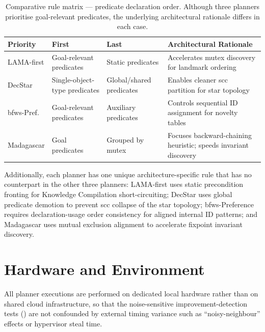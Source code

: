 \begin{table}[htbp]
  \centering
  \caption{Comparative rule matrix --- predicate declaration order. Although three planners prioritise goal-relevant predicates, the underlying architectural rationale differs in each case.}
  \label{tab:rule_matrix_predicates}
  \small
  \begin{tabular}{p{2.5cm} p{3cm} p{3cm} p{4.5cm}}
    \toprule
    \textbf{Priority} & \textbf{First} & \textbf{Last} & \textbf{Architectural Rationale} \\
    \midrule
    LAMA-first & Goal-relevant predicates & Static predicates & Accelerates mutex discovery for landmark ordering \\
    \addlinespace
    DecStar & Single-object-type predicates & Global/shared predicates & Enables cleaner \gls{scc} partition for star topology \\
    \addlinespace
    \gls{bfws}-Pref. & Goal-relevant predicates & Auxiliary predicates & Controls sequential ID assignment for novelty tables \\
    \addlinespace
    Madagascar & Goal predicates & Grouped by mutex & Focuses backward-chaining heuristic; speeds invariant discovery \\
    \bottomrule
  \end{tabular}
\end{table}

Additionally, each planner has one unique architecture-specific rule that has no counterpart in the other three planners:
LAMA-first uses static precondition fronting for Knowledge Compilation short-circuiting;
DecStar uses global predicate demotion to prevent \gls{scc} collapse of the star topology;
\gls{bfws}-Preference requires declaration-usage order consistency for aligned internal ID patterns;
and Madagascar uses mutual exclusion alignment to accelerate fixpoint invariant discovery.


\section{Hardware and Environment}
\label{sec:setup:hardware}

All planner executions are performed on dedicated local hardware rather than on shared cloud infrastructure, so that the noise-sensitive improvement-detection tests () are not confounded by external timing variance such as ``noisy-neighbour'' effects or hypervisor steal time.

